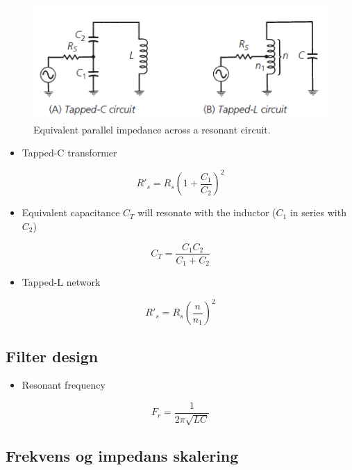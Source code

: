 \begin{figure} [H]
	\centering
	\includegraphics[width=0.8\linewidth]{graphics/25.png}
	\caption{Equivalent parallel impedance across a resonant circuit.}
	\label{fig:25}
\end{figure}

\begin{itemize}
	\item Tapped-C transformer
\end{itemize}

\begin{equation}
R'_s = R_s \left(1+\dfrac{C_1}{C_2}\right)^2
\end{equation}

\begin{itemize}
	\item Equivalent capacitance $C_T$ will resonate with the inductor ($C_1$ in series with $C_2$)
\end{itemize}

\begin{equation}
C_T=\dfrac{C_1 C_2}{C_1+C_2}
\end{equation}

\begin{itemize}
	\item Tapped-L network
\end{itemize}

\begin{equation}
R'_s = R_s \left(\dfrac{n}{n_1}\right)^2
\end{equation}


\subsection{Filter design}
\begin{itemize}
	\item Resonant frequency
\end{itemize}

\begin{equation}
F_r=\dfrac{1}{2\pi\sqrt{L C}}
\end{equation}

\subsection{Frekvens og impedans skalering}